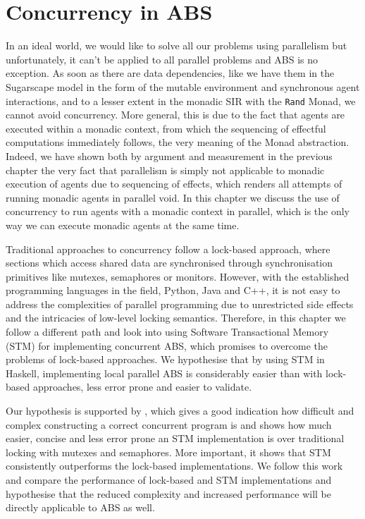 \chapter{Concurrency in ABS}
\label{ch:concurrent_abs}
In an ideal world, we would like to solve all our problems using parallelism but unfortunately, it can't be applied to all parallel problems and ABS is no exception. As soon as there are data dependencies, like we have them in the Sugarscape model in the form of the mutable environment and synchronous agent interactions, and to a lesser extent in the monadic SIR with the \texttt{Rand} Monad, we cannot avoid concurrency. More general, this is due to the fact that agents are executed within a monadic context, from which the  sequencing of effectful computations immediately follows, the very meaning of the Monad abstraction. Indeed, we have shown both by argument and measurement in the previous chapter the very fact that parallelism is simply not applicable to monadic execution of agents due to sequencing of effects, which renders all attempts of running monadic agents in parallel void. In this chapter we discuss the use of concurrency to run agents with a monadic context in parallel, which is the only way we can execute monadic agents at the same time.

\medskip

Traditional approaches to concurrency follow a lock-based approach, where sections which access shared data are synchronised through synchronisation primitives like mutexes, semaphores or monitors. However, with the established programming languages in the field, Python, Java and C++, it is not easy to address the complexities of parallel programming due to unrestricted side effects and the intricacies of low-level locking semantics. Therefore, in this chapter we follow a different path and look into using Software Transactional Memory (STM) for implementing concurrent ABS, which promises to overcome the problems of lock-based approaches. We hypothesise that by using STM in Haskell, implementing local parallel ABS is considerably easier than with lock-based approaches, less error prone and easier to validate.

Our hypothesis is supported by \cite{discolo_lock_2006}, which gives a good indication how difficult and complex constructing a correct concurrent program is and shows how much easier, concise and less error prone an STM implementation is over traditional locking with mutexes and semaphores. More important, it shows that STM consistently outperforms the lock-based implementations. We follow this work and compare the performance of lock-based and STM implementations and hypothesise that the reduced complexity and increased performance will be directly applicable to ABS as well.

